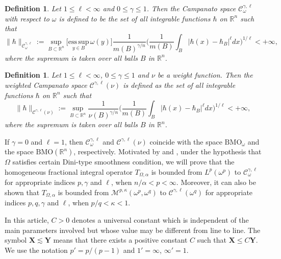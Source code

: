 \documentclass[preprint,10pt]{elsarticle}
\newtheorem{defin}[thm]{Definition}
\numberwithin{equation}{section}
\begin{document}
\begin{defin}
Let $1\leq\ell<\infty$ and $0\leq\gamma\leq1$. Then the Campanato space $\mathcal{C}^{\gamma,\ell}_{\omega}$ with respect to $\omega$ is defined to be the set of all integrable functions $\hbar$ on $\mathbb R^n$ such that
\begin{equation*}
\|\hbar\|_{\mathcal{C}^{\gamma,\ell}_{\omega}}:=\sup_{B\subset\mathbb R^n}\Big[\underset{y\in{B}}{\mathrm{ess\,sup}}\,\omega(y)\Big]
\frac{1}{m(B)^{\gamma/n}}\bigg(\frac{1}{m(B)}\int_{B}|\hbar(x)-\hbar_B|^{\ell}dx\bigg)^{1/{\ell}}<+\infty,
\end{equation*}
where the supremum is taken over all balls $B$ in $\mathbb R^n$.
\end{defin}

\begin{defin}
Let $1\leq\ell<\infty$, $0\leq\gamma\leq1$ and $\nu$ be a weight function. Then the weighted Campanato space $\mathcal{C}^{\gamma,\ell}({\nu})$ is defined as the set of all integrable functions $\hbar$ on $\mathbb R^n$ such that
\begin{equation*}
\|\hbar\|_{\mathcal{C}^{\gamma,\ell}({\nu})}:=\sup_{B\subset\mathbb R^n}\frac{1}{\nu(B)^{\gamma/n}}
\bigg(\frac{1}{m(B)}\int_{B}|\hbar(x)-\hbar_B|^{\ell}dx\bigg)^{1/{\ell}}<+\infty,
\end{equation*}
where the supremum is taken over all balls $B$ in $\mathbb R^n$.
\end{defin}
If $\gamma=0$ and $\ell=1$, then $\mathcal{C}^{\gamma,\ell}_{\omega}$ and $\mathcal{C}^{\gamma,\ell}({\nu})$ coincide with the space $\mathrm{BMO}_{\omega}$ and the space $\mathrm{BMO}(\mathbb R^n)$, respectively. Motivated by \cite{ding2} and \cite{wang2}, under the hypothesis
that $\Omega$ satisfies certain Dini-type smoothness condition, we will prove that the homogeneous fractional integral operator $T_{\Omega,\alpha}$
is bounded from $L^{p}(\omega^p)$ to $\mathcal{C}^{\gamma,\ell}_{\omega}$ for appropriate indices $p,\gamma$ and $\ell$, when $n/{\alpha}<p<\infty$. Moreover, it can also be shown that $T_{\Omega,\alpha}$ is bounded from $\mathcal{M}^{p,\kappa}(\omega^p,\omega^q)$ to $\mathcal{C}^{\gamma,\ell}(\omega^q)$ for appropriate indices $p,q,\gamma$ and $\ell$, when $p/q<\kappa<1$.

In this article, $C>0$ denotes a universal constant which is independent of the main parameters involved but whose value may be different from line to line. The symbol $\mathbf{X}\lesssim \mathbf{Y}$ means that there exists a positive constant $C$ such that $\mathbf{X}\leq C\mathbf{Y}$. We use the notation $p'=p/{(p-1)}$ and $1'=\infty$, $\infty'=1$.
\end{document}
